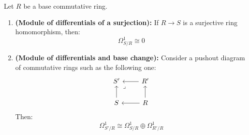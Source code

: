                 \begin{proposition} \label{prop: differentials_and_finite_colimits}
                    Let $R$ be a base commutative ring. 
                        \begin{enumerate}
                            \item \textbf{(Module of differentials of a surjection):} If $R \to S$ is a surjective ring homomorphism, then:
                                $$\Omega^1_{S/R} \cong 0$$
                            \item \textbf{(Module of differentials and base change):} Consider a pushout diagram of commutative rings such as the following one:
                                $$
                                    \begin{tikzcd}
                                    	{S'} & {R'} \\
                                    	S & R
                                    	\arrow[from=2-2, to=2-1]
                                    	\arrow[from=2-1, to=1-1]
                                    	\arrow[from=2-2, to=1-2]
                                    	\arrow[from=1-2, to=1-1]
                                    	\arrow["\lrcorner"{anchor=center, pos=0.125}, draw=none, from=1-1, to=2-2]
                                    \end{tikzcd}
                                $$
                            Then:
                                $$\Omega^1_{S'/R} \cong \Omega^1_{S/R} \oplus \Omega^1_{R'/R}$$
                        \end{enumerate}
                \end{proposition}

